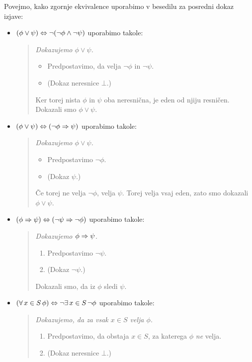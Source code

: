 Povejmo, kako zgornje ekvivalence uporabimo v besedilu za posredni
dokaz izjave:
%
\begin{itemize}
\item $(\phi \lor \psi) \Leftrightarrow \lnot (\lnot\phi \land \lnot\psi)$
  uporabimo takole:
  \begin{quote}
    \it
    Dokazujemo $\phi \lor \psi$.
    \begin{itemize}
    \item[] Predpostavimo, da velja $\lnot\phi$ in $\lnot\psi$.
    \item[] (Dokaz neresnice $\bot$.)
    \end{itemize}
    Ker torej nista $\phi$ in $\psi$ oba neresnična, je eden od njiju
    resničen. Dokazali smo $\phi \lor \psi$.
  \end{quote}
\item $(\phi \lor \psi) \Leftrightarrow (\lnot\phi \Rightarrow \psi)$ uporabimo
  takole:
  \begin{quote}
    \it
    Dokazujemo $\phi \lor \psi$.
    \begin{itemize}
    \item[] Predpostavimo $\lnot\phi$.
    \item[] (Dokaz $\psi$.)
    \end{itemize}
    Če torej ne velja $\lnot\phi$, velja $\psi$. Torej velja vsaj
    eden, zato smo dokazali $\phi \lor \psi$.
  \end{quote}
\item $(\phi \Rightarrow \psi) \Leftrightarrow (\lnot\psi \Rightarrow \lnot\phi)$
  uporabimo takole:
  \begin{quote}
    \it
    Dokazujemo $\phi \Rightarrow \psi$.
    \begin{enumerate}
    \item Predpostavimo $\lnot\psi$.
    \item (Dokaz $\lnot\psi$.)
    \end{enumerate}
    Dokazali smo, da iz $\phi$ sledi $\psi$.
  \end{quote}
\item $(\forall\, x \in S \, \phi) \Leftrightarrow \lnot \exists\, x \in S \, \lnot \phi$
  uporabimo takole:
  \begin{quote}
    \it
    Dokazujemo, da za vsak $x \in S$ velja $\phi$.
    \begin{enumerate}
    \item Predpostavimo, da obstaja $x \in S$, za katerega $\phi$
      \emph{ne} velja.
    \item (Dokaz neresnice $\bot$.)

\end{enumerate}
\end{quote}
\end{itemize}
